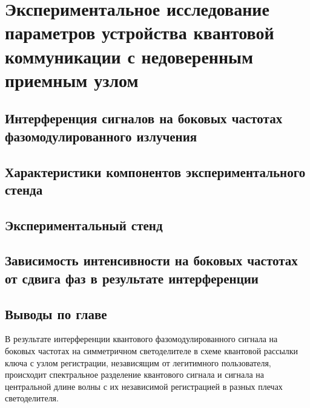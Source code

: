 \chapter{Экспериментальное исследование параметров устройства квантовой коммуникации с недоверенным приемным узлом} \label{ch:ch5}
\section{Интерференция сигналов на боковых частотах фазомодулированного излучения} \label{sec:ch5/sec1}




\section{Характеристики компонентов экспериментального стенда} \label{ch:ch5/sect2}


\section{Экспериментальный стенд} \label{ch:ch5/sect3}


\section{Зависимость интенсивности на боковых частотах от сдвига фаз в результате интерференции} \label{ch:ch5/sect4}


\section{Выводы по главе} \label{ch:ch5/sect5}


В результате интерференции квантового фазомодулированного сигнала на боковых частотах на симметричном светоделителе в схеме квантовой рассылки ключа с узлом регистрации, независящим от легитимного пользователя, происходит спектральное разделение квантового сигнала и сигнала на центральной длине волны с их независимой регистрацией в разных плечах светоделителя. 